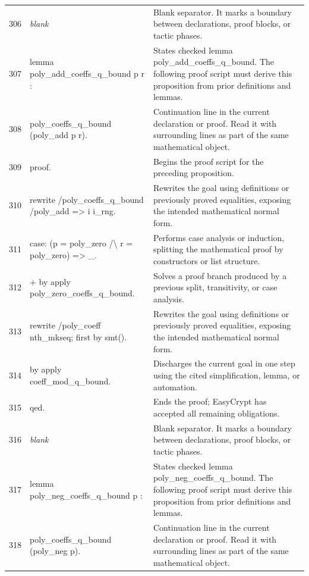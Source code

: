 \documentclass[10pt]{article}
\begin{document}
\begin{longtable}{r L{0.53\textwidth} L{0.37\textwidth}}
306 & {\ttfamily\scriptsize \emph{blank}} & Blank separator.  It marks a boundary between declarations, proof blocks, or tactic phases. \\
307 & {\ttfamily\scriptsize lemma poly\_add\_coeffs\_q\_bound p r :} & States checked lemma poly\_add\_coeffs\_q\_bound.  The following proof script must derive this proposition from prior definitions and lemmas. \\
308 & {\ttfamily\scriptsize   poly\_coeffs\_q\_bound (poly\_add p r).} & Continuation line in the current declaration or proof.  Read it with surrounding lines as part of the same mathematical object. \\
309 & {\ttfamily\scriptsize proof.} & Begins the proof script for the preceding proposition. \\
310 & {\ttfamily\scriptsize rewrite /poly\_coeffs\_q\_bound /poly\_add => i i\_rng.} & Rewrites the goal using definitions or previously proved equalities, exposing the intended mathematical normal form. \\
311 & {\ttfamily\scriptsize case: (p = poly\_zero /\textbackslash{} r = poly\_zero) => \_.} & Performs case analysis or induction, splitting the mathematical proof by constructors or list structure. \\
312 & {\ttfamily\scriptsize + by apply poly\_zero\_coeffs\_q\_bound.} & Solves a proof branch produced by a previous split, transitivity, or case analysis. \\
313 & {\ttfamily\scriptsize rewrite /poly\_coeff nth\_mkseq; first by smt().} & Rewrites the goal using definitions or previously proved equalities, exposing the intended mathematical normal form. \\
314 & {\ttfamily\scriptsize by apply coeff\_mod\_q\_bound.} & Discharges the current goal in one step using the cited simplification, lemma, or automation. \\
315 & {\ttfamily\scriptsize qed.} & Ends the proof; EasyCrypt has accepted all remaining obligations. \\
316 & {\ttfamily\scriptsize \emph{blank}} & Blank separator.  It marks a boundary between declarations, proof blocks, or tactic phases. \\
317 & {\ttfamily\scriptsize lemma poly\_neg\_coeffs\_q\_bound p :} & States checked lemma poly\_neg\_coeffs\_q\_bound.  The following proof script must derive this proposition from prior definitions and lemmas. \\
318 & {\ttfamily\scriptsize   poly\_coeffs\_q\_bound (poly\_neg p).} & Continuation line in the current declaration or proof.  Read it with surrounding lines as part of the same mathematical object. \\

\end{longtable}
\end{document}
